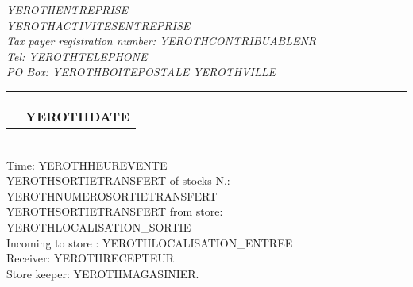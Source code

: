\documentclass[2pt]{article} %
\makeatletter
\newcommand{\headerrow}[2]
{\begin{tabular*}{\linewidth}{l@{\extracolsep{\fill}}r}
	#1 &
	#2 \\
\end{tabular*}}
\makeatother
\begin{document}
\emph{YEROTHENTREPRISE} \\
\emph{YEROTHACTIVITESENTREPRISE} \\
\emph{Tax payer registration number: YEROTHCONTRIBUABLENR} \\
\emph{Tel: YEROTHTELEPHONE} \\
\emph{PO Box: YEROTHBOITEPOSTALE YEROTHVILLE}

\vspace*{0.2cm}

\hrule

\headerrow
{}
{\textbf{YEROTHDATE}}\\

Time: YEROTHHEUREVENTE\\
YEROTHSORTIETRANSFERT of stocks N.: YEROTHNUMEROSORTIETRANSFERT\\
YEROTHSORTIETRANSFERT from store: YEROTHLOCALISATION_SORTIE\\
Incoming to store : YEROTHLOCALISATION_ENTREE\\
Receiver: YEROTHRECEPTEUR\\
Store keeper: YEROTHMAGASINIER.

\vspace*{0.2cm}

\end{document}
